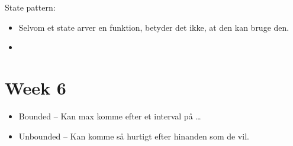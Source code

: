 \documentclass{article}
\begin{document}
State pattern:
\begin{itemize}
	\item Selvom et state arver en funktion, betyder det ikke, at den kan bruge den.
	\item 
\end{itemize}






\section{Week 6}
\begin{itemize}
	\item Bounded -- Kan max komme efter et interval på \dots
	\item Unbounded -- Kan komme så hurtigt efter hinanden som de vil.
\end{itemize}
\end{document}
